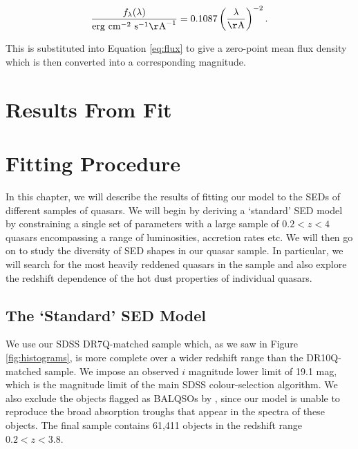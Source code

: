 \begin{eqnarray}
  \frac{f_\lambda(\lambda)}{{\rm erg}~{\rm cm}^{-2}~{\rm s}^{-1} {\rm\AA}^{-1}} = 0.1087 \left(\frac{\lambda}{\rm \AA}\right)^{-2} .
\end{eqnarray}

This is substituted into Equation \ref{eq:flux} to give a zero-point mean flux density which is then converted into a corresponding magnitude.  

\newpage

\section{Results From Fit} 
\label{chapter:results}

\section{Fitting Procedure}

In this chapter, we will describe the results of fitting our model to the SEDs of different samples of quasars. We will begin by deriving a `standard' SED model by constraining a single set of parameters with a large sample of $0.2 < z < 4$ quasars encompassing a range of luminosities, accretion rates etc. We will then go on to study the diversity of SED shapes in our quasar sample. In particular, we will search for the most heavily reddened quasars in the sample and also explore the redshift dependence of the hot dust properties of individual quasars. 

\subsection{The `Standard' SED Model} 

We use our SDSS DR7Q-matched sample which, as we saw in Figure \ref{fig:histograms}, is more complete over a wider redshift range than the DR10Q-matched sample. We impose an observed $i$ magnitude lower limit of 19.1 mag, which is the magnitude limit of the main SDSS colour-selection algorithm. We also exclude the objects flagged as BALQSOs by \citet{shen11}, since our model is unable to reproduce the broad absorption troughs that appear in the spectra of these objects. The final sample contains 61,411 objects in the redshift range $0.2 < z < 3.8$. 

